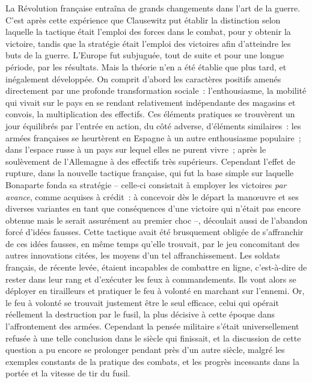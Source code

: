 \documentclass[french,twoside]{book} %
\begin{document}
\noindent La Révolution française entraîna de grands changements dans l’art de la guerre. C’est après cette expérience que Clausewitz put établir la distinction selon laquelle la tactique était l’emploi des forces dans le combat, pour y obtenir la victoire, tandis que la stratégie était l’emploi des victoires afin d’atteindre les buts de la guerre. L’Europe fut subjuguée, tout de suite et pour une longue période, par les résultats. Mais la théorie n’en a été établie que plus tard, et inégalement développée. On comprit d’abord les caractères positifs amenés directement par une profonde transformation sociale : l’enthousiasme, la mobilité qui vivait sur le pays en se rendant relativement indépendante des magasins et convois, la multiplication des effectifs. Ces éléments pratiques se trouvèrent un jour équilibrés par l’entrée en action, du côté adverse, d’éléments similaires : les armées françaises se heurtèrent en Espagne à un autre enthousiasme populaire ; dans l’espace russe à un pays sur lequel elles ne purent vivre ; après le soulèvement de l’Allemagne à des effectifs très supérieurs. Cependant l’effet de rupture, dans la nouvelle tactique française, qui fut la base simple sur laquelle Bonaparte fonda sa stratégie – celle-ci consistait à employer les victoires \emph{par avance}, comme acquises à crédit : à concevoir dès le départ la manœuvre et ses diverses variantes en tant que conséquences d’une victoire qui n’était pas encore obtenue mais le serait assurément au premier choc –, découlait aussi de l’abandon forcé d’idées fausses. Cette tactique avait été brusquement obligée de s’affranchir de ces idées fausses, en même temps qu’elle trouvait, par le jeu concomitant des autres innovations citées, les moyens d’un tel affranchissement. Les soldats français, de récente levée, étaient incapables de combattre en ligne, c’est-à-dire de rester dans leur rang et d’exécuter les feux à commandements. Ils vont alors se déployer en tirailleurs et pratiquer le feu à volonté en marchant sur l’ennemi. Or, le feu à volonté se trouvait justement être le seul efficace, celui qui opérait réellement la destruction par le fusil, la plus décisive à cette époque dans l’affrontement des armées. Cependant la pensée militaire s’était universellement refusée à une telle conclusion dans le siècle qui finissait, et la discussion de cette question a pu encore se prolonger pendant près d’un autre siècle, malgré les exemples constants de la pratique des combats, et les progrès incessants dans la portée et la vitesse de tir du fusil.\par
\end{document}
